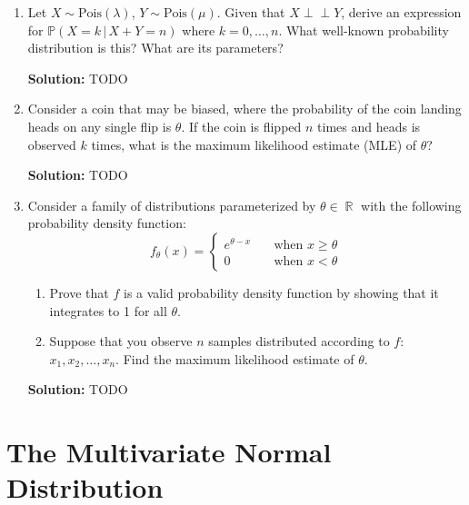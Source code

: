 \documentclass{article}
\newcommand{\Question}[1]{\Large \section{ #1 } \normalsize}
\DeclareMathOperator{\R}{\mathbb{R}}
\newenvironment{solution}{\color{blue} \smallskip \textbf{Solution:}}{}
\begin{document}
\begin{enumerate}
    \item
    Let $X\sim \text{Pois}(\lambda)$, $Y\sim \text{Pois}(\mu)$. 
    Given that $X \perp \!\!\! \perp Y$, derive an expression for ${\mathbb{P}(X = k \,|\, X+Y=n)}$ where $k = 0, \dots, n$. 
    What well-known probability distribution is this? What are its parameters?

    \begin{solution}
        TODO
    \end{solution}

    \item
    Consider a coin that may be biased, where the probability of the coin landing heads on any single flip is $\theta$. 
    If the coin is flipped $n$ times and heads is observed $k$ times, what is the maximum likelihood estimate (MLE) of $\theta$?

    \begin{solution}
        TODO
    \end{solution}

    \item 
    Consider a family of distributions parameterized by $\theta \in \R$ with the following probability density function:
    \[
        f_{\theta}(x) = \begin{cases}
            e^{\theta - x} \quad &\text{when } x \geq \theta \\
            0 \quad &\text{when } x < \theta
        \end{cases}
    \]
    \begin{enumerate}
        \item Prove that $f$ is a valid probability density function by showing that it integrates to 1 for all $\theta$.
        \item Suppose that you observe $n$ samples distributed according to $f$: $x_{1}, x_{2}, \ldots, x_{n}$. Find the maximum likelihood estimate of $\theta$.
    \end{enumerate}

    \begin{solution}
        TODO
    \end{solution}

\end{enumerate}

\newpage
\Question{The Multivariate Normal Distribution}
\end{document}
